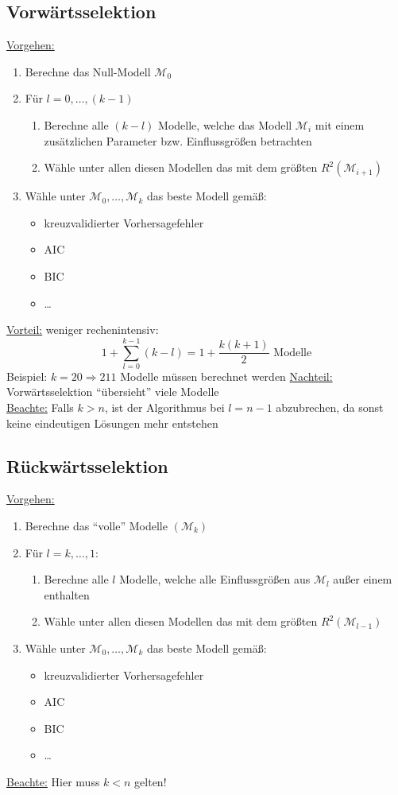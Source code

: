 \subsection{Vorwärtsselektion}
\underline{Vorgehen:} 
\begin{enumerate}
	\item Berechne das Null-Modell $\mathcal{M}_0$
	\item Für $l=0,\dots,(k-1)$
		\begin{enumerate}
			\item Berechne alle $(k-l)$ Modelle, welche das Modell $\mathcal{M}_i$ mit einem zusätzlichen Parameter bzw. Einflussgrößen betrachten
			\item Wähle unter allen diesen Modellen das mit dem größten $R^{2} (\mathcal{M}_{i+1})$
		\end{enumerate}
	\item Wähle unter $\mathcal{M}_0,\dots,\mathcal{M}_k$ das beste Modell gemäß:
		\begin{itemize}
			\item kreuzvalidierter Vorhersagefehler
			\item AIC
			\item BIC
			\item \dots
		\end{itemize}
\end{enumerate}
\underline{Vorteil:} weniger rechenintensiv:
\[ 1 + \sum\limits_{l=0}^{k-1} (k-l)=1+ \frac{k(k+1)}{2} \text{ Modelle}\]
Beispiel: $k=20 \Rightarrow 211$ Modelle müssen berechnet werden
\underline{Nachteil:} Vorwärtsselektion ``übersieht'' viele Modelle  \\
\underline{Beachte:} Falls $k > n$, ist der Algorithmus bei $l=n-1$ abzubrechen, da sonst keine eindeutigen Lösungen mehr entstehen

\subsection{Rückwärtsselektion}
\underline{Vorgehen:}
\begin{enumerate}
	\item Berechne das ``volle'' Modelle $(\mathcal{M}_k)$
	\item Für $l=k,\dots,1:$
		\begin{enumerate}
			\item Berechne alle $l$ Modelle, welche alle Einflussgrößen aus $\mathcal{M}_l$ außer einem enthalten
			\item Wähle unter allen diesen Modellen das mit dem größten $R^{2} (\mathcal{M}_{l-1})$
		\end{enumerate}
	\item Wähle unter $\mathcal{M}_0,\dots,\mathcal{M}_k$ das beste Modell gemäß:
		\begin{itemize}
			\item kreuzvalidierter Vorhersagefehler
			\item AIC
			\item BIC
			\item \dots
		\end{itemize}
\end{enumerate}
\underline{Beachte:} Hier muss $k < n$ gelten!
